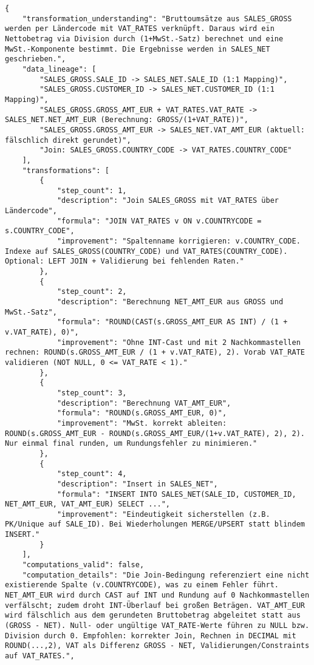 \begin{lstlisting}[caption={Ausgabe: GPT-5 Anwendungsfall 5 Hauptdurchlauf},label={gpt_case5_prompt1}]
{
    "transformation_understanding": "Bruttoumsätze aus SALES_GROSS werden per Ländercode mit VAT_RATES verknüpft. Daraus wird ein Nettobetrag via Division durch (1+MwSt.-Satz) berechnet und eine MwSt.-Komponente bestimmt. Die Ergebnisse werden in SALES_NET geschrieben.",
    "data_lineage": [
        "SALES_GROSS.SALE_ID -> SALES_NET.SALE_ID (1:1 Mapping)",
        "SALES_GROSS.CUSTOMER_ID -> SALES_NET.CUSTOMER_ID (1:1 Mapping)",
        "SALES_GROSS.GROSS_AMT_EUR + VAT_RATES.VAT_RATE -> SALES_NET.NET_AMT_EUR (Berechnung: GROSS/(1+VAT_RATE))",
        "SALES_GROSS.GROSS_AMT_EUR -> SALES_NET.VAT_AMT_EUR (aktuell: fälschlich direkt gerundet)",
        "Join: SALES_GROSS.COUNTRY_CODE -> VAT_RATES.COUNTRY_CODE"
    ],
    "transformations": [
        {
            "step_count": 1,
            "description": "Join SALES_GROSS mit VAT_RATES über Ländercode",
            "formula": "JOIN VAT_RATES v ON v.COUNTRYCODE = s.COUNTRY_CODE",
            "improvement": "Spaltenname korrigieren: v.COUNTRY_CODE. Indexe auf SALES_GROSS(COUNTRY_CODE) und VAT_RATES(COUNTRY_CODE). Optional: LEFT JOIN + Validierung bei fehlenden Raten."
        },
        {
            "step_count": 2,
            "description": "Berechnung NET_AMT_EUR aus GROSS und MwSt.-Satz",
            "formula": "ROUND(CAST(s.GROSS_AMT_EUR AS INT) / (1 + v.VAT_RATE), 0)",
            "improvement": "Ohne INT-Cast und mit 2 Nachkommastellen rechnen: ROUND(s.GROSS_AMT_EUR / (1 + v.VAT_RATE), 2). Vorab VAT_RATE validieren (NOT NULL, 0 <= VAT_RATE < 1)."
        },
        {
            "step_count": 3,
            "description": "Berechnung VAT_AMT_EUR",
            "formula": "ROUND(s.GROSS_AMT_EUR, 0)",
            "improvement": "MwSt. korrekt ableiten: ROUND(s.GROSS_AMT_EUR - ROUND(s.GROSS_AMT_EUR/(1+v.VAT_RATE), 2), 2). Nur einmal final runden, um Rundungsfehler zu minimieren."
        },
        {
            "step_count": 4,
            "description": "Insert in SALES_NET",
            "formula": "INSERT INTO SALES_NET(SALE_ID, CUSTOMER_ID, NET_AMT_EUR, VAT_AMT_EUR) SELECT ...",
            "improvement": "Eindeutigkeit sicherstellen (z.B. PK/Unique auf SALE_ID). Bei Wiederholungen MERGE/UPSERT statt blindem INSERT."
        }
    ],
    "computations_valid": false,
    "computation_details": "Die Join-Bedingung referenziert eine nicht existierende Spalte (v.COUNTRYCODE), was zu einem Fehler führt. NET_AMT_EUR wird durch CAST auf INT und Rundung auf 0 Nachkommastellen verfälscht; zudem droht INT-Überlauf bei großen Beträgen. VAT_AMT_EUR wird fälschlich aus dem gerundeten Bruttobetrag abgeleitet statt aus (GROSS - NET). Null- oder ungültige VAT_RATE-Werte führen zu NULL bzw. Division durch 0. Empfohlen: korrekter Join, Rechnen in DECIMAL mit ROUND(...,2), VAT als Differenz GROSS - NET, Validierungen/Constraints auf VAT_RATES.",

\end{lstlisting}
